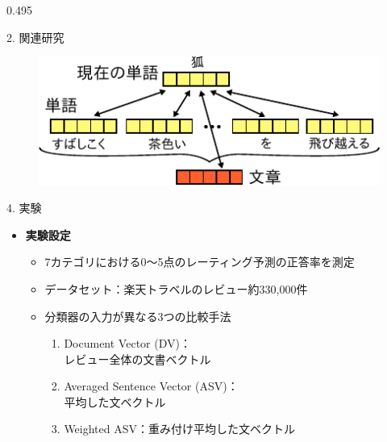 \documentclass[unicode,10pt]{beamer}
\newcommand{\mycolumnwidth}{0.495\textwidth}
\newcommand{\itemtitle}[1]{\textbf{#1}\\}
\begin{document}
\begin{frame}
\begin{columns}[onlytextwidth,t]
\begin{column}{\mycolumnwidth}
\begin{block}{2. 関連研究}
\begin{itemize}
    \end{itemize}
    \begin{figure}
      \includegraphics[width=0.8\linewidth]{fig/paragraph_vector.pdf}
    \end{figure}
  \end{block}

  \begin{block}{4. 実験}
    \begin{itemize}
      \item \itemtitle{実験設定}
        \begin{itemize}
          \item 7カテゴリにおける0〜5点のレーティング予測の正答率を測定
          \item データセット：楽天トラベルのレビュー約330,000件
          \item 分類器の入力が異なる3つの比較手法
            \begin{enumerate}
              \item Document Vector (DV)：\\レビュー全体の文書ベクトル
              \item Averaged Sentence Vector (ASV)：\\平均した文ベクトル
              \item Weighted ASV：重み付け平均した文ベクトル
            \end{enumerate}
        \end{itemize}
    \end{itemize}


\end{block}
\end{column}
\end{columns}
\end{frame}
\end{document}
